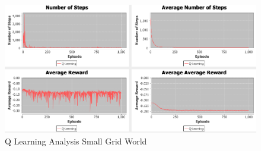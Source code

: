 \documentclass[11pt]{article}
\newcommand{\problemone}{Small Grid World}
\begin{document}
    \begin{figure}
        \begin{minipage}{1\textwidth}
            \centering
            \includegraphics[width=1\linewidth]{qlearningdeepdive.png}
            \caption{Q Learning Analysis \problemone}\label{Fig:Q-Learning DD \problemone}
        \end{minipage}
    \end{figure}
\end{document}
